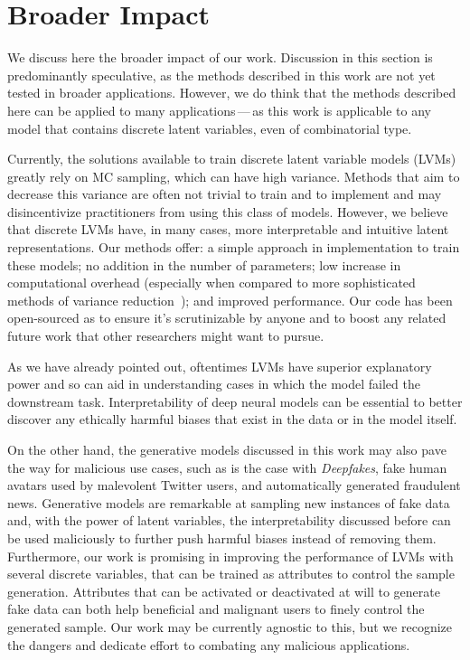 \section{Broader Impact}\label{sec:impact}

We discuss here the broader impact of our work. Discussion in this
section is predominantly speculative, as the methods described in
this work are not yet tested in broader applications. However, we do
think that the methods described here can be applied to many
applications\,---\,as this work is applicable to any model that
contains discrete latent variables, even of combinatorial type.

Currently, the solutions available to train discrete latent variable
models (LVMs) greatly rely on MC sampling, which can have high variance.
Methods that aim to decrease this variance are often not trivial to
train and to implement and may disincentivize practitioners from
using this class of models. However, we believe that discrete LVMs
have, in many cases, more interpretable and intuitive
latent representations. Our methods offer: a simple approach in
implementation to train these models; no addition in the number of
parameters; low increase in computational overhead (especially when
compared to more sophisticated methods of variance
reduction~\citep{RB19}); and improved performance. Our code has been
open-sourced as to ensure it's scrutinizable by
anyone and to boost any related future work that other researchers
might want to pursue.

As we have already pointed out, oftentimes LVMs
have superior explanatory power and so can aid in understanding cases
in which the model failed the downstream task. Interpretability of
deep neural models can be essential to better discover any ethically
harmful biases that exist in the data or in the model itself.

On the other hand, the generative models discussed in this work may
also pave the way for malicious use cases, such as is the case with
\emph{Deepfakes}, fake human avatars used by malevolent Twitter
users, and automatically generated fraudulent news. Generative models
are remarkable at sampling new instances of fake data and, with the
power of latent variables, the interpretability discussed before can
be used maliciously to further push harmful biases instead of
removing them. Furthermore, our work is promising in improving the
performance of LVMs with several discrete
variables, that can be trained as attributes to control the sample
generation. Attributes that can be activated or deactivated at will
to generate fake data can both help beneficial and malignant users to
finely control the generated sample. Our work may be currently
agnostic to this, but we recognize the dangers and dedicate effort to
combating any malicious applications.

